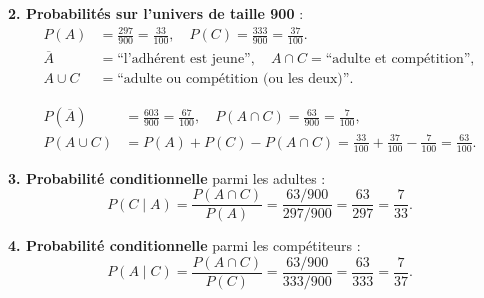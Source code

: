 \documentclass[12pt,a4paper]{article}
\begin{document}
\textbf{2. Probabilités sur l'univers de taille 900} :
\begin{align*}
P(A)&=\frac{297}{900}=\frac{33}{100},\quad P(C)=\frac{333}{900}=\frac{37}{100}.\\
\overline A&=\text{“l’adhérent est jeune”},\quad A\cap C=\text{“adulte et compétition”},\\
A\cup C&=\text{“adulte ou compétition (ou les deux)”}.
\end{align*}

\begin{align*}
P(\overline A)&=\frac{603}{900}=\frac{67}{100},\quad P(A\cap C)=\frac{63}{900}=\frac{7}{100},\\
P(A\cup C)&=P(A)+P(C)-P(A\cap C)=\frac{33}{100}+\frac{37}{100}-\frac{7}{100}=\frac{63}{100}.
\end{align*}

\textbf{3. Probabilité conditionnelle} parmi les adultes :
$$P(C\mid A)=\frac{P(A\cap C)}{P(A)}=\frac{63/900}{297/900}=\frac{63}{297}=\frac{7}{33}.$$

\textbf{4. Probabilité conditionnelle} parmi les compétiteurs :
$$P(A\mid C)=\frac{P(A\cap C)}{P(C)}=\frac{63/900}{333/900}=\frac{63}{333}=\frac{7}{37}.$$
\end{document}
